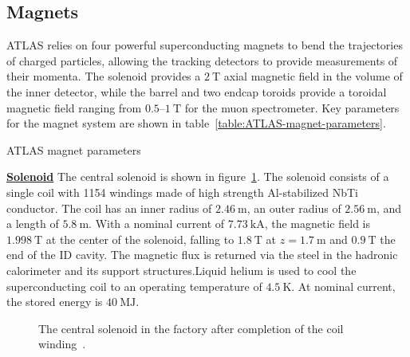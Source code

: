 \subsection{Magnets}
ATLAS relies on four powerful superconducting magnets to bend the trajectories of charged particles, allowing the tracking detectors to provide measurements of their momenta. The solenoid provides a $2~\mbox{T}$ axial magnetic field in the volume of the inner detector, while the barrel and two endcap toroids provide a toroidal magnetic field ranging from $0.5$--$1~\mbox{T}$ for the muon spectrometer. Key parameters for the magnet system are shown in table~\ref{table:ATLAS-magnet-parameters}.

\begin{table}[htbp]
	\centering
	ATLAS magnet parameters
\end{table}


\underline{\textbf{Solenoid}}
The central solenoid is shown in figure~\ref{fig:solenoid}. The solenoid consists of a single coil with 1154 windings made of high strength Al-stabilized NbTi conductor. The coil has an inner radius of $2.46~\mbox{m}$, an outer radius of $2.56~\mbox{m}$, and a length of $5.8~\mbox{m}$. With a nominal current of $7.73~\mbox{kA}$, the magnetic field is $1.998~\mbox{T}$ at the center of the solenoid, falling to $1.8~\mbox{T}$ at $z=1.7~\mbox{m}$ and $0.9~\mbox{T}$ the end of the ID cavity. The magnetic flux is returned via the steel in the hadronic calorimeter and its support structures.Liquid helium is used to cool the superconducting coil to an operating temperature of $4.5~\mbox{K}$. At nominal current, the stored energy is $40~\mbox{MJ}$. 

\begin{figure}[htbp]
	\centering
	\caption{The central solenoid in the factory after completion of the coil winding~\cite{TheATLASCollaboration:2008fg}.}
	\label{fig:solenoid}
\end{figure}


